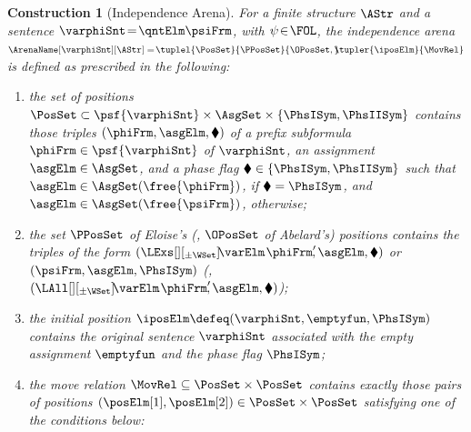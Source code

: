 \documentclass[authoryear]{elsarticle}
\newtheorem{construction}{Construction}
\begin{document}
\begin{construction}[Independence Arena]
  \label{cns:semarn}
  For a finite structure $\AStr$ and a \pnf \ADIF sentence $\varphiSnt \!=\!
  \qntElm \psiFrm$, with $\psi \!\in\! \FOL$, the \emph{independence arena}
  $\ArenaName[\varphiSnt][\AStr] =\! \tuplel {\PosSet} {\PPosSet}
  {\OPosSet,}\!\!\! \allowbreak \tupler {\iposElm} {\MovRel}$ is defined as
  prescribed in the following:
  \begin{enumerate}[1)]
    \item\label{cns:semarn(pos)}
      the set of positions $\PosSet \subset \psf{\varphiSnt} \times \AsgSet
      \times \{ \PhsISym, \PhsIISym \}$ contains those triples $(\phiFrm,
      \asgElm, \blacklozenge)$ of a prefix subformula $\phiFrm \in
      \psf{\varphiSnt}$ of $\varphiSnt$, an assignment $\asgElm \in \AsgSet$,
      and a phase flag $\blacklozenge \in \{ \PhsISym, \PhsIISym \}$ such that
      $\asgElm \in \AsgSet(\free{\phiFrm})$, if $\blacklozenge = \PhsISym$, and
      $\asgElm \in \AsgSet(\free{\psiFrm})$, otherwise;
    \item\label{cns:semarn(eap)}
      the set $\PPosSet$ of Eloise's (\resp, $\OPosSet$ of Abelard's) positions
      contains the triples of the form $(\LExs[][_{\pm\WSet}] \!\varElm\!
      \ldotp\! \phiFrm'\!\!, \asgElm, \blacklozenge)$ or $(\psiFrm, \asgElm,
      \PhsISym)$ (\resp, $(\LAll[][_{\pm\WSet}] \!\varElm\! \ldotp\!
      \phiFrm'\!\!, \asgElm, \blacklozenge)$);
    \item\label{cns:semarn(ini)}
      the initial position $\iposElm \defeq (\varphiSnt, \emptyfun, \PhsISym)$
      contains the original sentence $\varphiSnt$ associated with the empty
      assignment $\emptyfun$ and the phase flag $\PhsISym$;
    \item\label{cns:semarn(mov)}
      the move relation $\MovRel \subseteq \PosSet \times \PosSet$ contains
      exactly those pairs of positions $(\posElm[1], \posElm[2]) \in \PosSet
      \times \PosSet$ satisfying one of the conditions below:
      \begin{enumerate}[a)]
        \item\label{cns:semarn(mov:noc)}
          $\posElm[1] = (\Qnt[][_{\pm\WSet}] \varElm \ldotp \phiFrm', \asgElm,
          \blacklozenge)$ and $\posElm[2] = (\phiFrm', \asgElm, \blacklozenge)$,
          with $\varElm \not\in \free{\phiFrm'}$;
        \item\label{cns:semarn(mov:chc)}
          $\posElm[1] = (\Qnt[][_{\pm\WSet}] \varElm \ldotp \phiFrm'\!, \asgElm,
          \PhsISym)$ and $\posElm[2] = (\phiFrm'\!, {\asgElm}[\varElm

\end{enumerate}
\end{enumerate}
\end{construction}
\end{document}
